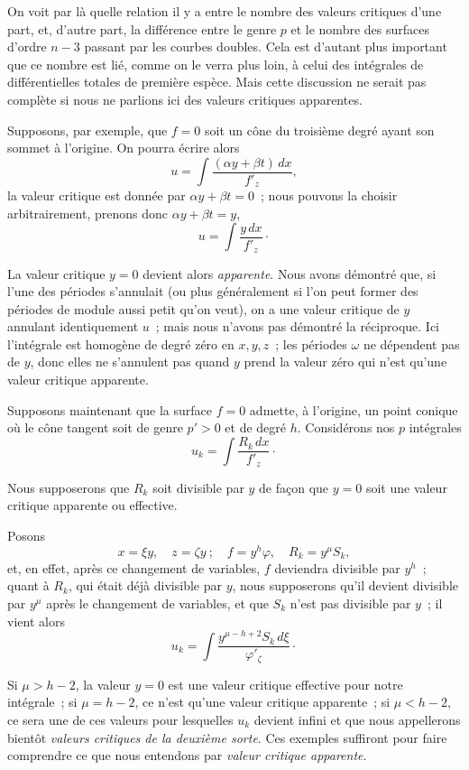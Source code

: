 \documentclass{article}
\begin{document}
On voit par là quelle relation il y a entre le nombre des valeurs
critiques d'une part, et, d'autre part, la différence entre le genre $p$ et le nombre des surfaces d'ordre $n - 3$ passant par les courbes doubles. Cela est d'autant plus important que ce nombre est lié, comme on le verra plus loin, à celui des intégrales de différentielles totales de première espèce. Mais cette discussion ne serait pas complète si nous ne parlions ici des valeurs critiques apparentes.

Supposons, par exemple, que $f = 0$ soit un cône du troisième degré ayant son sommet à l'origine. On pourra écrire alors
\[
u = \int \frac{(\alpha y + \beta t) \,dx}{f'_{z}},
\]
la valeur critique est donnée par $\alpha y + \beta t = 0$~; nous pouvons la choisir arbitrairement, prenons donc $\alpha y + \beta t = y$,
\[
u = \int \frac{y \,dx}{f'_{z}} \cdot
\]

La valeur critique $y = 0$ devient alors \emph{apparente}. Nous avons démontré que, si l'une des périodes s'annulait (ou plus généralement si l'on peut former des périodes de module aussi petit qu'on veut), on a une valeur critique de $y$ annulant identiquement $u$~; mais nous n'avons pas démontré la réciproque. Ici l'intégrale est homogène de degré zéro en $x, y, z$~; les périodes $\omega$ ne dépendent pas de $y$, donc elles ne s'annulent pas quand $y$ prend la valeur zéro qui n'est qu'une valeur critique apparente.

Supposons maintenant que la surface $f = 0$ admette, à l'origine, un point conique où le cône tangent soit de genre $p' > 0$ et de degré $h$. Considérons nos $p$ intégrales
\[
u_{k} = \int \frac{R_{k} \,dx}{f'_{z}} \cdot
\]

Nous supposerons que $R_{k}$ soit divisible par $y$ de façon que $y = 0$ soit une valeur critique apparente ou effective.

Posons
\[
x = \xi y, \quad z = \zeta y~; \quad f = y^{h} \varphi, \quad R_{k} = y^{\mu} S_{k},
\]
et, en effet, après ce changement de variables, $f$ deviendra divisible
par $y^{h}$~; quant à $R_{k}$, qui était déjà divisible par $y$, nous supposerons qu'il devient divisible par $y^{\mu}$ après le changement de variables, et que $S_{k}$ n'est pas divisible par $y$~; il vient alors
\[
u_{k} = \int \frac{y^{\mu - h + 2} S_{k} \,d\xi}{\varphi'_{\zeta}} \cdot
\]

Si $\mu > h - 2$, la valeur $y = 0$ est une valeur critique effective pour notre intégrale~; si $\mu = h - 2$, ce n'est qu'une valeur critique apparente~; si $\mu < h - 2$, ce sera une de ces valeurs pour lesquelles $u_{k}$ devient infini et que nous appellerons bientôt \emph{valeurs critiques de la deuxième sorte}. Ces exemples suffiront pour faire comprendre ce que nous entendons par \emph{valeur critique apparente}.
\end{document}
